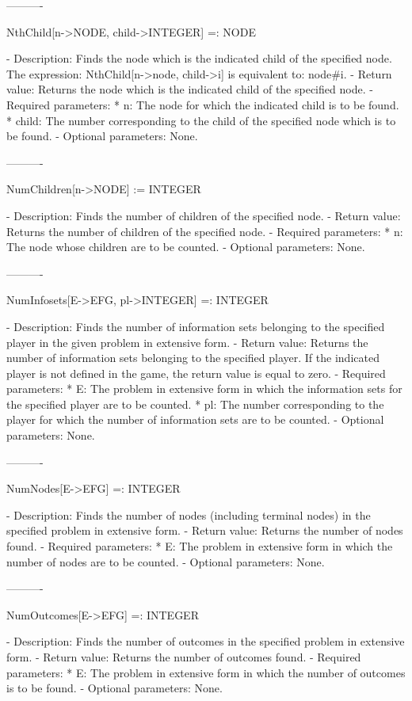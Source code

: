 ----------

NthChild[n->NODE, child->INTEGER] =: NODE

   -	Description:  Finds the node which is the indicated child of the 
	specified node.  The expression:  NthChild[n->node, child->i] is 
	equivalent to:  node#i.
   -	Return value:  Returns the node which is the indicated child of the
	specified node.
   -	Required parameters:
	  *  n:  The node for which the indicated child is to be found.
	  *  child:  The number corresponding to the child of the specified 
		node which is to be found.
   -	Optional parameters:  None.

----------

NumChildren[n->NODE] := INTEGER

   -	Description:  Finds the number of children of the specified node.
   -	Return value:  Returns the number of children of the specified node.
   -	Required parameters:
	  *  n:  The node whose children are to be counted.
   -	Optional parameters:  None.

----------

NumInfosets[E->EFG, pl->INTEGER] =: INTEGER

   -	Description:  Finds the number of information sets belonging to the
	specified player in the given problem in extensive form.
   -	Return value:  Returns the number of information sets belonging to
	the specified player.  If the indicated player is not defined in the 
	game, the return value is equal to zero.
   -	Required parameters:
	  *  E:  The problem in extensive form in which the information sets
		for the specified player are to be counted.
	  *  pl:  The number corresponding to the player for which the number 
		of information sets are to be counted.
   -	Optional parameters:  None.

----------

NumNodes[E->EFG] =: INTEGER

   -	Description:  Finds the number of nodes (including terminal nodes) in 
	the specified problem in extensive form.
   -	Return value:  Returns the number of nodes found.
   -	Required parameters:
	  *  E:  The problem in extensive form in which the number of nodes are
		to be counted.
   -	Optional parameters:  None.

----------

NumOutcomes[E->EFG] =: INTEGER

   -	Description:  Finds the number of outcomes in the specified problem in
	extensive form.
   -	Return value:  Returns the number of outcomes found.
   -	Required parameters:
	  *  E:  The problem in extensive form in which the number of outcomes
		is to be found.
   -	Optional parameters:  None.


